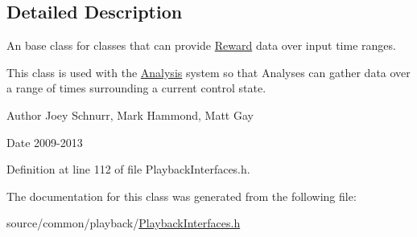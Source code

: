 \subsection{Detailed Description}
An base class for classes that can provide \hyperlink{class_picto_1_1_reward}{Reward} data over input time ranges. 

This class is used with the \hyperlink{class_picto_1_1_analysis}{Analysis} system so that Analyses can gather data over a range of times surrounding a current control state. \begin{DoxyAuthor}{Author}
Joey Schnurr, Mark Hammond, Matt Gay 
\end{DoxyAuthor}
\begin{DoxyDate}{Date}
2009-\/2013 
\end{DoxyDate}


Definition at line 112 of file Playback\-Interfaces.\-h.



The documentation for this class was generated from the following file\-:\begin{DoxyCompactItemize}
\item 
source/common/playback/\hyperlink{_playback_interfaces_8h}{Playback\-Interfaces.\-h}\end{DoxyCompactItemize}
